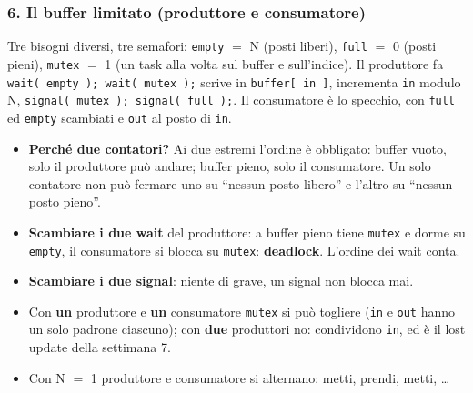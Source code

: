 \subsubsection*{6. Il buffer limitato (produttore e consumatore)}
Tre bisogni diversi, tre semafori: \texttt{empty} $=$ N (posti liberi), \texttt{full} $=$ 0 (posti pieni), \texttt{mutex} $=$ 1 (un task alla volta sul buffer e sull'indice). Il produttore fa \texttt{wait( empty ); wait( mutex );} scrive in \texttt{buffer[ in ]}, incrementa \texttt{in} modulo N, \texttt{signal( mutex ); signal( full );}. Il consumatore è lo specchio, con \texttt{full} ed \texttt{empty} scambiati e \texttt{out} al posto di \texttt{in}.
\begin{itemize}
    \item \textbf{Perché due contatori?} Ai due estremi l'ordine è obbligato: buffer vuoto, solo il produttore può andare; buffer pieno, solo il consumatore. Un solo contatore non può fermare uno su ``nessun posto libero'' e l'altro su ``nessun posto pieno''.
    \item \textbf{Scambiare i due wait} del produttore: a buffer pieno tiene \texttt{mutex} e dorme su \texttt{empty}, il consumatore si blocca su \texttt{mutex}: \textbf{deadlock}. L'ordine dei wait conta.
    \item \textbf{Scambiare i due signal}: niente di grave, un signal non blocca mai.
    \item Con \textbf{un} produttore e \textbf{un} consumatore \texttt{mutex} si può togliere (\texttt{in} e \texttt{out} hanno un solo padrone ciascuno); con \textbf{due} produttori no: condividono \texttt{in}, ed è il lost update della settimana 7.
    \item Con N $=$ 1 produttore e consumatore si alternano: metti, prendi, metti, \dots
\end{itemize}

